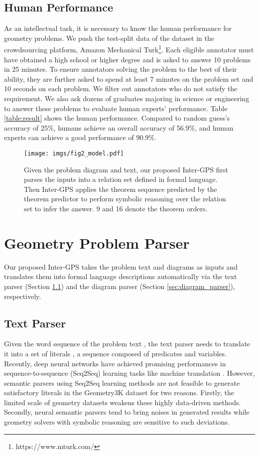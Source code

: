 \documentclass[11pt,a4paper]{article}
\begin{document}
\subsection{Human Performance}
As an intellectual task, it is necessary to know the human performance for geometry problems. We push the test-split data of the dataset in the crowdsourcing platform, Amazon Mechanical Turk\footnote{https://www.mturk.com/}. Each eligible annotator must have obtained a high school or higher degree and is asked to answer 10 problems in 25 minutes. To ensure annotators solving the problem to the best of their ability, they are further asked to spend at least 7 minutes on the problem set and 10 seconds on each problem. We filter out annotators who do not satisfy the requirement.  We also ask dozens of graduates majoring in science or engineering to answer these problems to evaluate human experts' performance. Table \ref{table:result} shows the human performance. Compared to random guess's accuracy of 25\%, humans achieve an overall accuracy of 56.9\%, and human experts can achieve a good performance of 90.9\%.




\begin{figure*}[th]
    \centering 
    \texttt{[image: imgs/fig2\_model.pdf]}
\caption{Given the problem diagram and text, our proposed Inter-GPS first parses the inputs into a relation set defined in formal language. Then Inter-GPS applies the theorem sequence predicted by the theorem predictor to perform symbolic reasoning over the relation set to infer the answer. \textcircled{\scriptsize{9}} and \textcircled{\scriptsize{16}} denote the theorem orders.}
\label{fig:model}
\end{figure*}

\section{Geometry Problem Parser}
Our proposed Inter-GPS takes the problem text and diagrams as inputs and translates them into formal language descriptions automatically via the text parser (Section \ref{sec:text_parser}) and the diagram parser (Section \ref{sec:diagram_parser}), respectively.

\subsection{Text Parser} \label{sec:text_parser}
Given the word sequence of the problem text , the text parser needs to translate it into a set of literals , a sequence composed of predicates and variables. Recently, deep neural networks have achieved promising performances in sequence-to-sequence (Seq2Seq) learning tasks like machine translation \cite{sutskever2014sequence,vaswani2017attention,devlin2018bert}. However, semantic parsers using Seq2Seq learning methods are not feasible to generate satisfactory literals in the Geometry3K dataset for two reasons. Firstly, the limited scale of geometry datasets weakens these highly data-driven methods. Secondly, neural semantic parsers tend to bring noises in generated results while geometry solvers with symbolic reasoning are sensitive to such deviations. 
\end{document}
